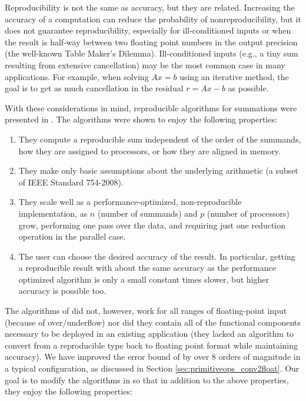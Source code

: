   Reproducibility is not the same as accuracy, but they are related. Increasing the accuracy of a computation can reduce the probability of nonreproducibility, but it does not guarantee reproducibility, especially for ill-conditioned inputs or when the result is half-way between two floating point numbers in the output precision (the well-known Table Maker's Dilemma)\cite{taufer}. Ill-conditioned inputs (e.g., a tiny sum resulting from extensive cancellation) may be the most common case in many applications. For example, when solving $Ax = b$ using an iterative method, the goal is to get as much cancellation in the residual $r = Ax - b$ as possible.

  With these considerations in mind, reproducible algorithms for summations were presented in \cite{repsum}. The algorithms were shown to enjoy the following properties:
  \begin{enumerate}
    \item They compute a reproducible sum independent of the order of the summands, how they are assigned to processors, or how they are aligned in memory.
    \item They make only basic assumptions about the underlying arithmetic (a subset of IEEE Standard 754-2008).
    \item They scale well as a performance-optimized, non-reproducible implementation, as $n$ (number of summands) and $p$ (number of processors) grow, performing one pass over the data, and requiring just one reduction operation in the parallel case.
    \item The user can choose the desired accuracy of the result. In particular, getting a reproducible result with about the same accuracy as the performance optimized algorithm is only a small constant times slower, but higher accuracy is possible too.
  \end{enumerate}
  The algorithms of \cite{repsum} did not, however, work for all ranges of floating-point input (because of over/underflow) nor did they contain all of the functional components necessary to be deployed in an existing application (they lacked an algorithm to convert from a reproducible type back to floating point format while maintaining accuracy).
   We have improved the error bound of \cite{repsum} by over 8 orders of magnitude in a typical configuration, as discussed in Section \ref{sec:primitiveops_conv2float}. Our goal is to modify the algorithms in \cite{repsum} so that in addition to the above properties, they enjoy the following properties:
